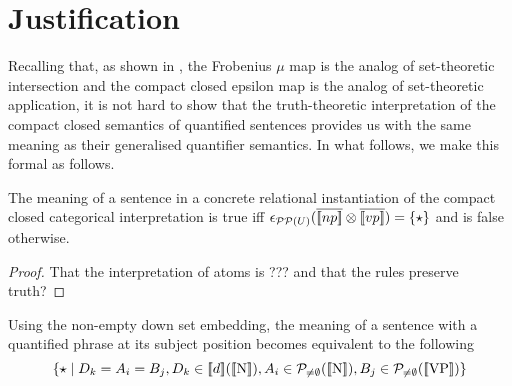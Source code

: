 \section{Justification}
\label{just}



Recalling that, as shown in \cite{CoeckePaquettePavlovic09,CoeckePaq},  the Frobenius $ \mu$ map is the analog of  set-theoretic intersection and the compact closed  epsilon map is the analog of  set-theoretic application, it is not hard to show that  the truth-theoretic interpretation of the compact closed semantics of quantified sentences provides us with the same meaning as their generalised quantifier semantics. In what follows,  we make this formal as follows. 

\begin{definition}
The meaning of a sentence in a concrete relational instantiation of the compact closed categorical interpretation is true  iff $\epsilon_{{\cal P}{\cal P}(U)} (\overline{[\![ np ]\!]} \otimes \overline{[\![ vp ]\!]}) = \{\star\}$ and  is false otherwise. 
\end{definition}

\begin{proof}
That the interpretation of atoms is ??? and that the rules preserve truth?
\end{proof}

\begin{lemma}
Using the non-empty down set embedding, the meaning of a sentence with a quantified phrase at its subject position becomes equivalent to the following
\[
 \{\star \mid  D_k = A_i = B_j , D_k \in \semantics{d}(\semantics{\text{N}}),  A_i \in {\cal P}_{\neq \emptyset} (\semantics{\text{N}}), B_j \in  {\cal P}_{\neq \emptyset} (\semantics{\text{VP}})\}
 \]
\end{lemma}

